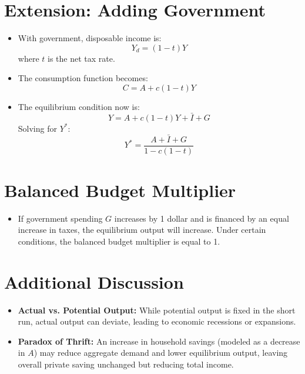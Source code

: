 \section*{Extension: Adding Government}
\begin{itemize}
    \item With government, disposable income is:
    \[
    Y_d = (1-t)Y
    \]
    where \(t\) is the net tax rate.
    \item The consumption function becomes:
    \[
    C = A + c(1-t)Y
    \]
    \item The equilibrium condition now is:
    \[
    Y = A + c(1-t)Y + \bar{I} + G
    \]
    Solving for \(Y^*\):
    \[
    Y^* = \frac{A + \bar{I} + G}{1 - c(1-t)}
    \]
\end{itemize}

\section*{Balanced Budget Multiplier}
\begin{itemize}
    \item If government spending \(G\) increases by 1 dollar and is financed by an equal increase in taxes, the equilibrium output will increase. Under certain conditions, the balanced budget multiplier is equal to 1.
\end{itemize}

\section*{Additional Discussion}
\begin{itemize}
    \item \textbf{Actual vs. Potential Output:} While potential output is fixed in the short run, actual output can deviate, leading to economic recessions or expansions.
    \item \textbf{Paradox of Thrift:} An increase in household savings (modeled as a decrease in \(A\)) may reduce aggregate demand and lower equilibrium output, leaving overall private saving unchanged but reducing total income.
\end{itemize}
